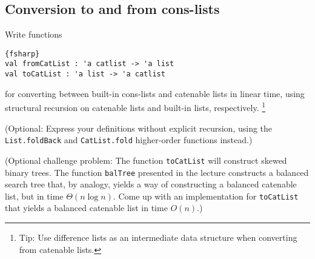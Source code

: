 \subsection*{Conversion to and from cons-lists}

Write functions
\begin{lstlisting}{fsharp}
val fromCatList : 'a catlist -> 'a list
val toCatList : 'a list -> 'a catlist
\end{lstlisting}
for converting between built-in cons-lists and catenable lists in linear time, using structural recursion on catenable lists and built-in lists, respectively.
\footnote{Tip: Use difference lists as an intermediate data structure when converting from catenable lists.}

(Optional: Express your definitions without explicit recursion, using the \texttt{List.foldBack} and \texttt{CatList.fold} higher-order functions instead.)

(Optional challenge problem: The function \verb|toCatList| will construct skewed binary trees.  The function \verb|balTree| presented in the lecture constructs a balanced search tree that, by analogy, yields a way of constructing a balanced catenable list, but in time $\Theta(n \log n)$.  Come up with an implementation for \verb|toCatList| that yields a balanced catenable list in time $O(n)$.)
